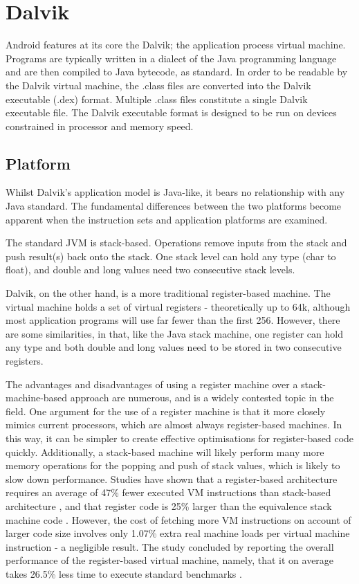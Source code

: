 \section{Dalvik}
\label{sec:dalvik}

Android features at its core the Dalvik; the application process virtual machine. Programs are typically written in a dialect of the Java programming language and are then compiled to Java bytecode, as standard. In order to be readable by the Dalvik virtual machine, the .class files are converted into the Dalvik executable (.dex) format. Multiple .class files constitute a single Dalvik executable file. The Dalvik executable format is designed to be run on devices constrained in processor and memory speed.

\subsection*{Platform}

Whilst Dalvik's application model is Java-like, it bears no relationship with any Java standard. The fundamental differences between the two platforms become apparent when the instruction sets and application platforms are examined.

The standard JVM is stack-based. Operations remove inputs from the stack and push result(s) back onto the stack. One stack level can hold any type (char to float), and double and long values need two consecutive stack levels.

Dalvik, on the other hand, is a more traditional register-based machine. The virtual machine holds a set of virtual registers - theoretically up to 64k, although most application programs will use far fewer than the first 256. However, there are some similarities, in that, like the Java stack machine, one register can hold any type and both double and long values need to be stored in two consecutive registers.

The advantages and disadvantages of using a register machine over a stack-machine-based approach are numerous, and is a widely contested topic in the field. One argument for the use of a register machine is that it more closely mimics current processors, which are almost always register-based machines. In this way, it can be simpler to create effective optimisations for register-based code quickly. Additionally, a stack-based machine will likely perform many more memory operations for the popping and push of stack values, which is likely to slow down performance. Studies have shown that a register-based architecture requires an average of 47\% fewer executed VM instructions than stack-based architecture \cite{vmshowdown}, and that register code is 25\% larger than the equivalence stack machine code \cite{vmshowdown}. However, the cost of fetching more VM instructions on account of larger code size involves only 1.07\% extra real machine loads per virtual machine instruction \cite{vmshowdown} - a negligible result. The study concluded by reporting the overall performance of the register-based virtual machine, namely, that it on average takes 26.5\% less time to execute standard benchmarks \cite{vmshowdown}.

